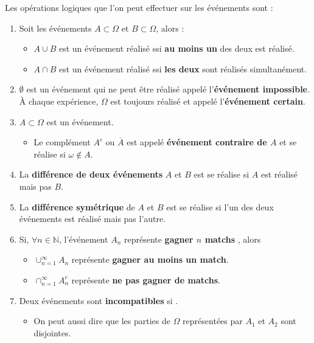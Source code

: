 \documentclass[10pt, french]{article}
\begin{document}
\begin{multicols*}{2}
\begin{definitionNOHFILLprop}
Les opérations logiques que l'on peut effectuer sur les événements sont : 
\begin{enumerate}
	\item	Soit les événements $A \subset \Omega$ et $B \subset \Omega$, alors : 
		\begin{itemize}
		\item	$A \cup B$ est un événement réalisé ssi \textbf{au moins un} des deux est réalisé.
		\item	$A \cap B$ est un événement réalisé ssi \textbf{les deux} sont réalisés simultanément.
		\end{itemize}
	\item	$\emptyset$ est un événement qui ne peut être réalisé appelé l'\textbf{événement impossible}. À chaque expérience, $\Omega$ est toujours réalisé et appelé l'\textbf{événement certain}.
	\item	$A \subset \Omega$ est un événement.
		\begin{itemize}
		\item	Le complément $A^{c}$ ou $\overline{A}$ est appelé \textbf{événement contraire de $A$} et se réalise si $\omega \notin A$.
		\end{itemize}
	\item	La \textbf{différence de deux événements} $A$ et $B$ est  se réalise si $A$ est réalisé mais pas $B$.
	\item	La \textbf{différence symétrique} de $A$ et $B$ est  se réalise si l'un des deux événements est réalisé mais pas l'autre.
	\item	Si, $\forall n \in \mathbb{N}$, l'événement $A_{n}$ représente \og \textbf{gagner $n$ matchs} \fg{}, alors 
		\begin{itemize}
		\item	$\displaystyle \cup_{n = 1}^{\infty} A_{n}$ représente \og \textbf{gagner au moins un match}\fg{}.
		\item	$\displaystyle \cap_{n = 1}^{\infty} A_{n}^{c}$ représente \og \textbf{ne pas gagner de matchs}\fg{}.
		\end{itemize}
	\item	Deux événements sont \textbf{incompatibles} si . 
		\begin{itemize}
		\item	On peut aussi dire que les parties de $\Omega$ représentées par $A_{1}$ et $A_{2}$ sont disjointes.

\end{itemize}
\end{enumerate}
\end{definitionNOHFILLprop}
\end{multicols*}
\end{document}
